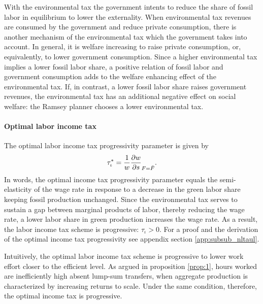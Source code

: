 With the environmental tax the government intents to reduce the share of fossil labor in equilibrium to lower the externality. 
When environmental tax revenues are consumed by the government and reduce private consumption, there is another mechanism of the environmental tax which the government takes into account. In general, it is welfare increasing to raise private consumption, or, equivalently, to lower government consumption. Since a higher environmental tax implies a lower fossil labor share, a positive relation of fossil labor and government consumption adds to the welfare enhancing effect of the environmental tax. If, in contrast, a lower fossil labor share raises government revenues, the environmental tax has an additional negative effect on social welfare: the Ramsey planner chooses a lower environmental tax. 


\paragraph{Optimal labor income tax}
The optimal labor income tax progressivity parameter is given by 
\begin{align}\label{eq:nls_taulopt}
\tau_\iota^*=\frac{1}{w}\frac{\partial{w}}{\partial{s}}_{F=\bar{F}}.
\end{align}
In words, the optimal income tax progressivity parameter equals the semi-elasticity of the wage rate in response to a decrease in the green labor share keeping fossil production unchanged. 
Since the environmental tax serves to sustain a gap between marginal products of labor, thereby  reducing the wage rate, a lower labor share in green production increases the wage rate. As a result, the labor income tax scheme is progressive: $\tau_\iota>0$. For a proof and the derivation of the optimal income tax progressivity see appendix section \ref{app:subsub_nltaul}.

Intuitively, the optimal labor income tax scheme is progressive to lower work effort closer to the efficient level. As argued in proposition \ref{prop:1}, hours worked are inefficiently high absent lump-sum transfers, when aggregate production is characterized by increasing returns to scale. Under the same condition, therefore, the optimal income tax is progressive. 


